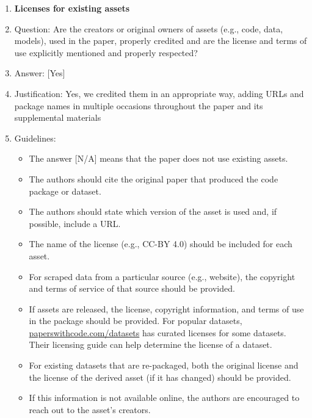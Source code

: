 \documentclass{llmxive}
\providecommand{\answerYes}[1][]{[Yes]#1}
\providecommand{\answerNA}[1][]{[N/A]#1}
\begin{document}
\begin{enumerate}
\item {\bf Licenses for existing assets}
    \item[] Question: Are the creators or original owners of assets (e.g., code, data, models), used in the paper, properly credited and are the license and terms of use explicitly mentioned and properly respected?
    \item[] Answer: \answerYes{}
    \item[] Justification: Yes, we credited them in an appropriate way, adding URLs and package names
in multiple occasions throughout the paper and its supplemental materials
    \item[] Guidelines:
    \begin{itemize}
        \item The answer \answerNA{} means that the paper does not use existing assets.
        \item The authors should cite the original paper that produced the code package or dataset.
        \item The authors should state which version of the asset is used and, if possible, include a URL.
        \item The name of the license (e.g., CC-BY 4.0) should be included for each asset.
        \item For scraped data from a particular source (e.g., website), the copyright and terms of service of that source should be provided.
        \item If assets are released, the license, copyright information, and terms of use in the package should be provided. For popular datasets, \url{paperswithcode.com/datasets} has curated licenses for some datasets. Their licensing guide can help determine the license of a dataset.
        \item For existing datasets that are re-packaged, both the original license and the license of the derived asset (if it has changed) should be provided.
        \item If this information is not available online, the authors are encouraged to reach out to the asset's creators.
    \end{itemize}


\end{enumerate}
\end{document}
